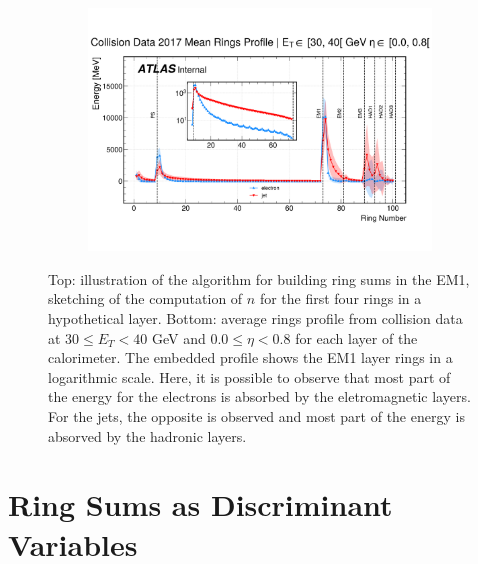 \begin{figure}[!ht]
\begin{center}
  \begin{subfigure}[c]{.7\textwidth}
  \centering
  \includegraphics[width=1.1\textwidth]{sections/03_ringer/figures/reco_steps/data17_zee_mean_rings_profiles_et2_eta0.pdf}
  \caption{}
  \label{fig:building_rings_b}
  \end{subfigure}
  \caption{
  Top: illustration of the \fastcalo algorithm for building ring sums in the EM1, sketching of the computation of $n$ for the first four rings in a hypothetical layer.
  	Bottom: average rings profile from collision data at $30 \leq E_T < 40$ GeV and $0.0 \leq \eta < 0.8$ for each layer of the calorimeter. The embedded profile shows the EM1 layer rings in a logarithmic scale. Here, it is possible to observe that most part of the energy for the electrons is absorbed by the eletromagnetic layers. For the jets, the opposite is observed and most part of the energy is absorved by the hadronic layers.}
  \end{center}
\end{figure}





\section{Ring Sums as Discriminant Variables}\label{ssec:ringer_id}


